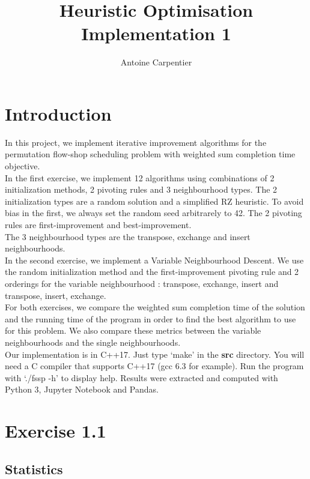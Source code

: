 \documentclass[a4paper,10pt]{article}
\title{Heuristic Optimisation\\Implementation 1}
\author{Antoine Carpentier}
\begin{document}
\maketitle

\section{Introduction}

In this project, we implement iterative improvement algorithms for the permutation flow-shop scheduling problem with weighted sum completion time objective. \\

In the first exercise, we implement 12 algorithms using combinations of 2 initialization methods, 2 pivoting rules and 3 neighbourhood types. The 2 initialization types are a random solution and a simplified RZ heuristic. To avoid bias in the first, we always set the random seed arbitrarely to 42. The 2 pivoting rules are first-improvement and best-improvement. \\
The 3 neighbourhood types are the transpose, exchange and insert neighbourhoods. \\

In the second exercise, we implement a Variable Neighbourhood Descent. We use the random initialization method and the first-improvement pivoting rule and 2 orderings for the variable neighbourhood : transpose, exchange, insert and transpose, insert, exchange. \\

For both exercises, we compare the weighted sum completion time of the solution and the running time of the program in order to find the best algorithm to use for this problem. We also compare these metrics between the variable neighbourhoods and the single neighbourhoods. \\

Our implementation is in C++17. Just type `make' in the \textbf{src} directory. You will need a C compiler that supports C++17 (gcc 6.3 for example). Run the program with `./fssp -h' to display help. Results were extracted and computed with Python 3, Jupyter Notebook and Pandas.

\section{Exercise 1.1}

\subsection{Statistics}
\end{document}
